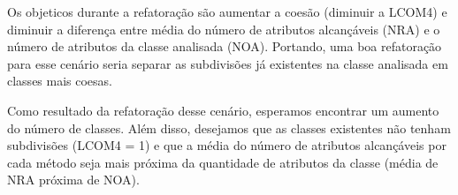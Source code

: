 	Os objeticos durante a refatoração são aumentar a coesão (diminuir a LCOM4) e diminuir a diferença entre média do número de atributos alcançáveis (NRA) e o número de atributos da classe analisada (NOA). Portando, uma boa refatoração para esse cenário seria separar as subdivisões já existentes na classe analisada em classes mais coesas.
	
	Como resultado da refatoração desse cenário, esperamos encontrar um aumento do número de classes. Além disso, desejamos que as classes existentes não tenham subdivisões (LCOM4 = 1) e que a média do número de atributos alcançáveis por cada método seja mais próxima da quantidade de atributos da classe (média de NRA próxima de NOA).
                  





